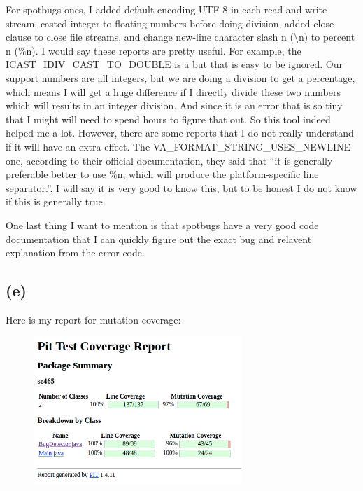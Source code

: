 \documentclass[12pt]{article}
\begin{document}
For spotbugs ones, I added default encoding UTF-8 in each read and write stream, casted integer to floating numbers before doing division, added close clause to close file streams, and change new-line character slash n (\textbackslash n) to percent n (\%n). I would say these reports are pretty useful. For example, the ICAST\_IDIV\_CAST\_TO\_DOUBLE is a but that is easy to be ignored. Our support numbers are all integers, but we are doing a division to get a percentage, which means I will get a huge difference if I directly divide these two numbers which will results in an integer division. And since it is an error that is so tiny that I might will need to spend hours to figure that out. So this tool indeed helped me a lot. However, there are some reports that I do not really understand if it will have an extra effect. The VA\_FORMAT\_STRING\_USES\_NEWLINE one, according to their official documentation, they said that ``it is generally preferable better to use \%n, which will produce the platform-specific line separator.''. I will say it is very good to know this, but to be honest I do not know if this is generally true. 

One last thing I want to mention is that spotbugs have a very good code documentation that I can quickly figure out the exact bug and relavent explanation from the error code. 

\subsection*{(e)}

Here is my report for mutation coverage:
\begin{figure}[H] %
\centering %
\includegraphics[width=0.7\textwidth]{pittest-coverage.png} %
\end{figure}
\end{document}
